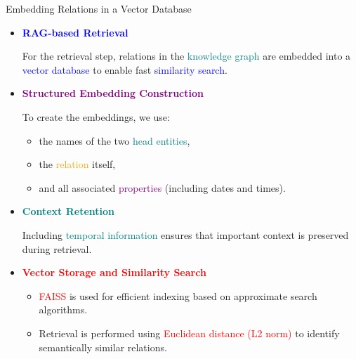 \documentclass[aspectratio=169,xcolor=dvipsnames]{beamer}
\begin{document}
	\begin{frame}{Embedding Relations in a Vector Database}
		
		\small
		\begin{itemize}
			
			\item \textbf{\textcolor{blue}{RAG-based Retrieval}}
			
			For the retrieval step, relations in the
			\textcolor{teal}{knowledge graph} are embedded into a
			\textcolor{blue}{vector database} to enable
			fast \textcolor{blue}{similarity search}.
			
			\vspace{0.15cm}
			
			\item \textbf{\textcolor{purple}{Structured Embedding Construction}}
			
			To create the embeddings, we use:
			\begin{itemize}
				\item the names of the two \textcolor{teal}{head entities},
				\item the \textcolor{orange}{relation} itself,
				\item and all associated \textcolor{purple}{properties}
				(including dates and times).
			\end{itemize}
			
			\vspace{0.15cm}
			
			\item \textbf{\textcolor{teal}{Context Retention}}
			
			Including \textcolor{teal}{temporal information} ensures that
			important context is preserved during retrieval.
			
			\vspace{0.15cm}
			
			\item \textbf{\textcolor{red}{Vector Storage and Similarity Search}}
			
			\begin{itemize}
				\item \textcolor{red}{FAISS} is used for efficient indexing based on
				approximate search algorithms.
				\item Retrieval is performed using
				\textcolor{red}{Euclidean distance (L2 norm)} to identify
				semantically similar relations.
			\end{itemize}
			
		\end{itemize}
		
	\end{frame}
	
\end{document}
